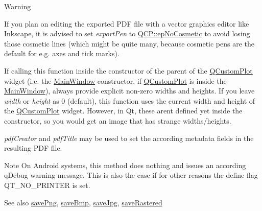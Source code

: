 \begin{DoxyWarning}{Warning}
\begin{DoxyItemize}
\item If you plan on editing the exported P\+DF file with a vector graphics editor like Inkscape, it is advised to set {\itshape export\+Pen} to \hyperlink{namespace_q_c_p_a17844f19e1019693a953e1eb93536d2faae8fcfaafee234ce18558afef83f6a78}{Q\+C\+P\+::ep\+No\+Cosmetic} to avoid losing those cosmetic lines (which might be quite many, because cosmetic pens are the default for e.\+g. axes and tick marks). \item If calling this function inside the constructor of the parent of the \hyperlink{class_q_custom_plot}{Q\+Custom\+Plot} widget (i.\+e. the \hyperlink{class_main_window}{Main\+Window} constructor, if \hyperlink{class_q_custom_plot}{Q\+Custom\+Plot} is inside the \hyperlink{class_main_window}{Main\+Window}), always provide explicit non-\/zero widths and heights. If you leave {\itshape width} or {\itshape height} as 0 (default), this function uses the current width and height of the \hyperlink{class_q_custom_plot}{Q\+Custom\+Plot} widget. However, in Qt, these aren\textquotesingle{}t defined yet inside the constructor, so you would get an image that has strange widths/heights.\end{DoxyItemize}
{\itshape pdf\+Creator} and {\itshape pdf\+Title} may be used to set the according metadata fields in the resulting P\+DF file.
\end{DoxyWarning}
\begin{DoxyNote}{Note}
On Android systems, this method does nothing and issues an according q\+Debug warning message. This is also the case if for other reasons the define flag {\ttfamily Q\+T\+\_\+\+N\+O\+\_\+\+P\+R\+I\+N\+T\+ER} is set.
\end{DoxyNote}
\begin{DoxySeeAlso}{See also}
\hyperlink{class_q_custom_plot_ac92cc9256d12f354b40a4be4600b5fb9}{save\+Png}, \hyperlink{class_q_custom_plot_ae3a86ed0795670e50afa21759d4fa13d}{save\+Bmp}, \hyperlink{class_q_custom_plot_a76f0d278e630a711fa6f48048cfd83e4}{save\+Jpg}, \hyperlink{class_q_custom_plot_ad7723ce2edfa270632ef42b03a444352}{save\+Rastered} 
\end{DoxySeeAlso}
\mbox{\label{class_q_custom_plot_ac92cc9256d12f354b40a4be4600b5fb9}} 
